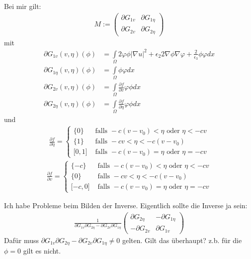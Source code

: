 \documentclass[10pt,a4paper]{article}
\begin{document}
Bei mir gilt:
\begin{align*}
	M:= \begin{pmatrix}
	\partial G_{1 v} & \partial G_{1 \eta} \\
	\partial G_{2 v} & \partial G_{2 \eta} 
	\end{pmatrix}
\end{align*}
mit
\begin{align*}
	 \partial G_{1 v} (v, \eta)(\phi) &= \int\limits_{\Omega} 2 \varphi  \phi | \nabla u|^2 + \epsilon_2 2 \nabla \phi \nabla \varphi  + \frac{2}{\epsilon_3} \phi \varphi d x \\
	\partial G_{1 \eta} (v, \eta) (\phi) &= \int\limits_{\Omega}  \phi \varphi  dx \\
	\partial G_{2 v} (v, \eta)(\phi) & = \int\limits_{\Omega} \frac{\partial f}{\partial v} \varphi \phi dx  \\
	\partial G_{2 \eta} (v, \eta)(\phi) & = \int\limits_{\Omega} \frac{\partial f}{\partial \eta} \varphi \phi dx 	
\end{align*}
und
\begin{align*}
	\frac{\partial f}{\partial \eta} = 
	\left\{
	\begin{array}{ll}
	\{0\}		& \text{ falls }  -c(v-v_0) < \eta \text{ oder }  \eta < -cv \\
	\{1\} 		& \text{ falls } -cv < \eta < -c(v-v_0) \\
	\lbrack 0,1 \rbrack	& \text{ falls }  -c(v-v_0) = \eta \text{ oder }  \eta = -cv 
	\end{array}
	\right .
\end{align*}	
\begin{align*}
	\frac{\partial f}{\partial v}= 
	\left\{
	\begin{array}{ll}
	\{-c\}		& \text{ falls }  -c(v-v_0) < \eta \text{ oder }  \eta < -cv \\
	\{0\}		& \text{ falls } -cv < \eta < -c(v-v_0) \\
	\lbrack -c,0 \rbrack	& \text{ falls }  -c(v-v_0) = \eta \text{ oder }  \eta = -cv 
	\end{array}
	\right .
\end{align*}	
 
Ich habe Probleme beim Bilden der Inverse. Eigentlich sollte die Inverse ja sein:
\begin{align*}
	\frac{1}{\partial G_{1v} \partial G_{2 \eta} - \partial G_{2v} \partial G_{1 \eta} } 
	\begin{pmatrix}
		\partial G_{2 \eta} & - \partial G_{1 \eta}\\
		-  \partial G_{2v} & \partial G_{1v} 
	\end{pmatrix}
\end{align*}
Dafür muss $\partial G_{1v} \partial G_{2 \eta} - \partial G_{2v} \partial G_{1 \eta} \neq 0$ gelten. Gilt das überhaupt? z.b. für die $\phi=0$ gilt es nicht. 
\end{document}
